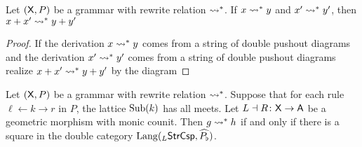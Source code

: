 \documentclass{amsart}
\begin{document}
\begin{lemma} \label{thm:rewrite-rel-is-additive}
  Let $( \mathsf{X},P )$ be a grammar with rewrite relation $\rightsquigarrow^\ast$.
  If $ x \rightsquigarrow^\ast y $ and $ x' \rightsquigarrow^\ast y' $, then
  $ x+x' \rightsquigarrow^\ast y+y' $
\end{lemma}

\begin{proof}
  If the derivation $ x \rightsquigarrow^\ast y $ comes from a string of
  double pushout diagrams
   and the derivation
  $ x' \rightsquigarrow^\ast y' $ comes from a string of double pushout
  diagrams  realize
  $ x+x' \rightsquigarrow^\ast y+y' $ by the diagram
  
\end{proof}

\begin{theorem} \label{thm:inductive-rewriting} Let
  $ ( \mathsf{X} , P ) $ be a grammar with rewrite relation
  $\rightsquigarrow^\ast$. Suppose that for each rule
  $\ell \gets k \to r$ in $P$, the lattice $ \operatorname{Sub} (k) $ has
  all meets.  Let $ L \dashv R \colon \mathsf{X} \to \mathsf{A} $ be a
  geometric morphism with monic counit. Then
  $ g \rightsquigarrow^\ast h $ if and only if there is a square
   in the double
  category $ \mathrm{Lang} ( _{L}\mathsf{StrCsp} , \widehat{P_\flat} ) $.
\end{theorem}
\end{document}
